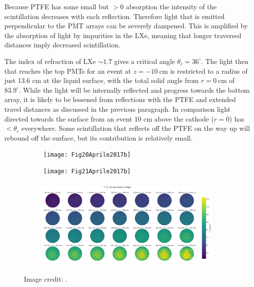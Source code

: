 Because PTFE has some small but $> 0$ absorption the intensity of the scintillation decreases with each reflection.  Therefore light
that is emitted perpendicular to the PMT arrays can be severely dampened.  This is amplified by the absorption of light by
impurities in the LXe, meaning that longer traversed distances imply decreased scintillation.

The index of refraction of LXe ${\sim} 1.7$
gives a critical angle $\theta_c = 36^{\circ}$.  The light then that reaches the top PMTs for an event at
$z = -10\ \mathrm{cm}$ is restricted to a radius of just 13.6 cm at the liquid surface, with the total solid angle from
$r = 0\ \mathrm{cm}$ of $83.9^{\circ}$.  While the light will be internally reflected and progress towards the bottom array, it is likely
to be lessened from reflections with the PTFE and extended travel distances as discussed in the previous paragraph. In comparison light
directed towards the surface from an event 10 cm above the cathode ($r = 0$)
has $< \theta_c$ everywhere.  Some scintillation that reflects off the PTFE on the way up will rebound off the surface, but its
contribution is relatively small.

\begin{figure}
    \centering
    \begin{subfigure}[t]{0.45\textwidth}
        \centering
        \texttt{[image: Fig20Aprile2017b]}
        \label{fig:calibrations_lce_lce_hist}
    \end{subfigure}%
    \begin{subfigure}[t]{0.45\textwidth}
        \centering
        \texttt{[image: Fig21Aprile2017b]} \\
        \label{fig:calibrations_lce_cle_map}
    \end{subfigure}
    \begin{subfigure}[b]{\textwidth}
        \centering
        \includegraphics[height=4.5cm]{LCEMapPolar}
        \label{fig:calibrations_lce_cle_map}
    \end{subfigure}
    \caption{Image credit: .}
	\label{fig:calibrations_lce_lce}
\end{figure}


